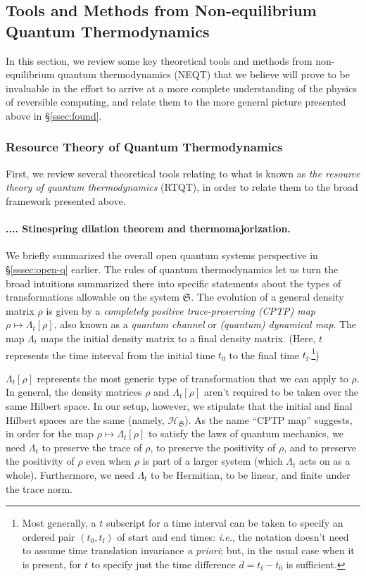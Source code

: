 \documentclass[preprints,article,accept,moreauthors,pdftex]{Definitions/mdpi}
\newcommand{\mypara}[1]{\paragraph{\arabic{section}.\arabic{subsection}.\arabic{subsubsection}.\arabic{paragraph}. #1}}
\begin{document}
\begin{paracol}{2}
\subsection{Tools and Methods from Non-equilibrium Quantum Thermodynamics}
\label{ssec:neqt}

In this section, we review some key theoretical tools and methods from non-equilibrium quantum thermodynamics (NEQT) that we believe will prove to be invaluable in the effort to arrive at a more complete understanding of the physics of reversible computing, and relate them to the more general picture presented above in \S\ref{ssec:found}.

\subsubsection{Resource Theory of Quantum Thermodynamics}
\label{sssec:rtqt}

First, we review several theoretical tools relating to what is known as \textit{the resource theory of quantum thermodynamics} (RTQT), in order to relate them to the broad framework presented above.

\mypara{Stinespring dilation theorem and thermomajorization.}
\label{par:Stinespring}

We briefly summarized the overall open quantum systems perspective in \S\ref{sssec:open-q} earlier. The rules of quantum thermodynamics let us turn the broad intuitions summarized there into specific statements about the types of transformations allowable on the system $\mathfrak{S}$. The evolution of a general density matrix $\rho$ is given by a \emph{completely positive trace-preserving \emph{(CPTP)} map} $\rho \mapsto \Lambda_{t}\left[\rho\right]$, also known as a \emph{quantum channel} or \emph{(quantum) dynamical map}. The map $\Lambda_{t}$ maps the initial density matrix to a final density matrix. (Here, $t$ represents the time interval from the initial time $t_{0}$ to the final time $t_\mathrm{f}$.\footnote{Most generally, a $t$ subscript for a time interval can be taken to specify an ordered pair $\left(t_{0},t_\mathrm{f}\right)$ of start and end times: \textit{i.e.}, the notation doesn't need to assume time translation invariance \emph{a priori}; but, in the usual case when it is present, for $t$ to specify just the time difference $d= t_{\mathrm{f}} - t_{0}$ is sufficient.})

$\Lambda_{t}\left[\rho\right]$ represents the most generic type of transformation that we can apply to $\rho$. In general, the density matrices $\rho$ and $\Lambda_{t}\left[\rho\right]$ aren't required to be taken over the same Hilbert space. In our setup, however, we stipulate that the initial and final Hilbert spaces are the same (namely, $\mathcal{H}_\mathfrak{S}$). As the name ``CPTP map'' suggests, in order for the map $\rho \mapsto \Lambda_{t}\left[\rho\right]$ to satisfy the laws of quantum mechanics, we need $\Lambda_{t}$ to preserve the trace of $\rho$, to preserve the positivity of $\rho$, and to preserve the positivity of $\rho$ even when $\rho$ is part of a larger system (which $\Lambda_{t}$ acts on as a whole). Furthermore, we need $\Lambda_{t}$ to be Hermitian, to be linear, and finite under the trace norm.


\end{paracol}
\end{document}
